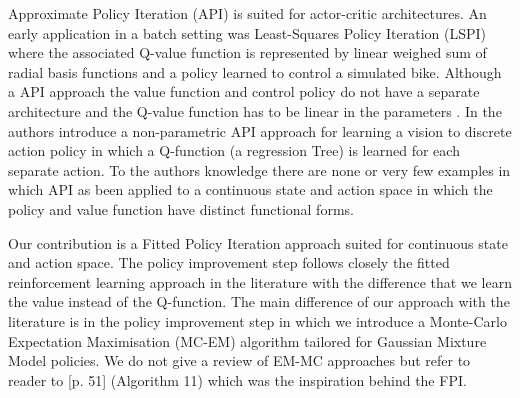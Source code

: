 \documentclass[final,5p,times,twocolumn]{elsarticle}
\begin{document}
Approximate Policy Iteration (API) \cite{Neuro_1996,Bertsekas2011} is suited for actor-critic architectures.
An early application in a batch setting was Least-Squares Policy Iteration (LSPI) \cite{LSPI_2003} where the associated 
Q-value function is represented by linear weighed sum of radial basis functions and a policy learned to control 
a simulated bike. Although a API approach the value function and control policy do not have a separate 
architecture and the Q-value function has to be linear in the parameters \cite{Sutton00policygradient}. In 
\cite{Jodogne2006} the authors introduce a non-parametric API approach for learning a vision to discrete action policy in which 
a Q-function (a regression Tree) is learned for each separate action. To the authors knowledge there are none or very 
few examples in which API as been applied to a continuous state and action space in which the policy and value function 
have distinct functional forms. 

Our contribution is a Fitted Policy Iteration approach suited for continuous state and action space. The policy improvement 
step follows closely the fitted reinforcement learning approach in the literature with the difference that we learn the value instead of 
the Q-function. The main difference of our approach with the literature is in the policy improvement step in which we introduce 
a Monte-Carlo Expectation Maximisation (MC-EM) algorithm tailored for Gaussian Mixture Model policies. We do not give a review 
of EM-MC approaches but refer to reader to \cite{rl_gradient_survey_2013}[p. 51] (Algorithm 11) which was the inspiration behind 
the FPI.

\end{document}
